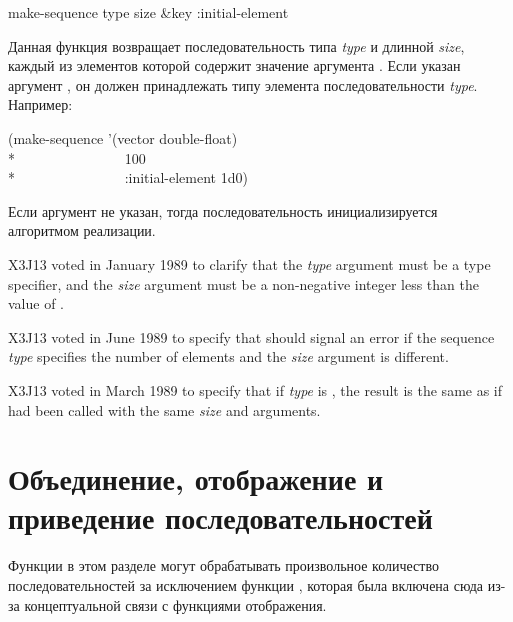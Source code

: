 \begin{defun}[Функция]
make-sequence type size &key :initial-element

Данная функция возвращает последовательность типа \emph{type} и длинной
\emph{size}, каждый из элементов которой содержит значение аргумента
.
Если указан аргумент , он должен принадлежать типу элемента
последовательности \emph{type}.
Например:
\begin{lisp}
(make-sequence '(vector double-float) \\*
~~~~~~~~~~~~~~~100 \\*
~~~~~~~~~~~~~~~:initial-element 1d0)
\end{lisp}
Если аргумент  не указан, тогда последовательность
инициализируется алгоритмом реализации.

\begin{new}
X3J13 voted in January 1989
to clarify that the \emph{type} argument
must be a type specifier, and the \emph{size} argument
must be a non-negative integer less than the value of
.
\end{new}

\begin{newer}
X3J13 voted in June 1989  to specify that
 should signal an error if the sequence \emph{type} specifies the
number of elements and the \emph{size} argument is different.
\end{newer}

\begin{newer}
X3J13 voted in March 1989 
to specify that if \emph{type} is , the result is the same
as if  had been called with the same \emph{size}
and  arguments.
\end{newer}
\end{defun}

\section{Объединение, отображение и приведение последовательностей}

Функции в этом разделе могут обрабатывать произвольное количество
последовательностей за исключением функции , которая была включена
сюда из-за концептуальной связи с функциями отображения.

